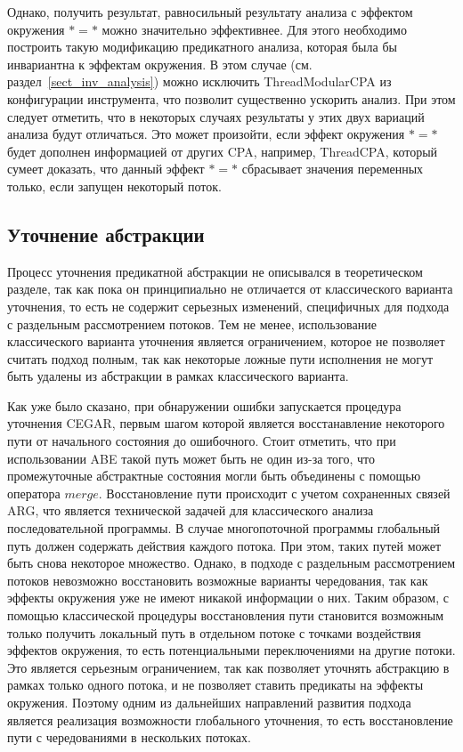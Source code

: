 Однако, получить результат, равносильный результату анализа с эффектом окружения $* = *$ можно значительно эффективнее.
Для этого необходимо построить такую модификацию предикатного анализа, которая была бы инвариантна к эффектам окружения.
В этом случае (см. раздел~\ref{sect_inv_analysis}) можно исключить ThreadModularCPA из конфигурации инструмента, что позволит существенно ускорить анализ.
При этом следует отметить, что в некоторых случаях результаты у этих двух вариаций анализа будут отличаться.
Это может произойти, если эффект окружения $* = *$ будет дополнен информацией от других CPA, например, ThreadCPA, который сумеет доказать, что данный эффект $* = *$ сбрасывает значения переменных только, если запущен некоторый поток.

\subsection{Уточнение абстракции}
\label{sect_predicate_refinement}
Процесс уточнения предикатной абстракции не описывался в теоретическом разделе, так как пока он принципиально не отличается от классического варианта уточнения, то есть не содержит серьезных изменений, специфичных для подхода с раздельным рассмотрением потоков.
Тем не менее, использование классического варианта уточнения является ограничением, которое не позволяет считать подход полным, так как некоторые ложные пути исполнения не могут быть удалены из абстракции в рамках классического варианта.

Как уже было сказано, при обнаружении ошибки запускается процедура уточнения CEGAR, первым шагом которой является восстанавление некоторого пути от начального состояния до ошибочного.  
Стоит отметить, что при использовании ABE такой путь может быть не один из-за того, что промежуточные абстрактные состояния могли быть объединены с помощью оператора $merge$. 
Восстановление пути происходит с учетом сохраненных связей ARG, что является технической задачей для классического анализа последовательной программы.
В случае многопоточной программы глобальный путь должен содержать действия каждого потока.
При этом, таких путей может быть снова некоторое множество.
Однако, в подходе с раздельным рассмотрением потоков невозможно восстановить возможные варианты чередования, так как эффекты окружения уже не имеют никакой информации о них.
Таким образом, с помощью классической процедуры восстановления пути становится возможным только получить локальный путь в отдельном потоке с точками воздействия эффектов окружения, то есть потенциальными переключениями на другие потоки. 
Это является серьезным ограничением, так как позволяет уточнять абстракцию в рамках только одного потока, и не позволяет ставить предикаты на эффекты окружения.
Поэтому одним из дальнейших направлений развития подхода является реализация возможности глобального уточнения, то есть восстановление пути с чередованиями в нескольких потоках.

